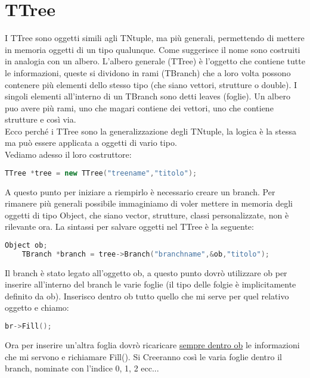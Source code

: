 \section{TTree}
I TTree sono oggetti simili agli TNtuple, ma più generali, permettendo di mettere in memoria oggetti di un tipo qualunque.
Come suggerisce il nome sono costruiti in analogia con un albero. L'albero generale (TTree) è l'oggetto che contiene tutte le informazioni, queste si dividono in rami (TBranch) che a loro volta possono contenere più elementi dello stesso tipo (che siano vettori, strutture o double). I singoli elementi all'interno di un TBranch sono detti leaves (foglie). Un albero puo avere più rami, uno che magari contiene dei vettori, uno che contiene strutture e così via.\\
Ecco perché i TTree sono la generalizzazione degli TNtuple, la logica è la stessa ma può essere applicata a oggetti di vario tipo.\\
Vediamo adesso il loro costruttore:
\begin{lstlisting}[language=C++,label={cod1},mathescape=true,breaklines=true]
	TTree *tree = new TTree("treename","titolo");
\end{lstlisting}
A questo punto per iniziare a riempirlo è necessario creare un branch. Per rimanere più generali possibile immaginiamo di voler mettere in memoria degli oggetti di tipo Object, che siano vector, strutture, classi personalizzate, non è rilevante ora. La sintassi per salvare oggetti nel TTree è la seguente:
\begin{lstlisting}[language=C++,label={cod1},mathescape=true,breaklines=true]
	Object ob;
	TBranch *branch = tree->Branch("branchname",&ob,"titolo");
\end{lstlisting}
Il branch è stato legato all'oggetto ob, a questo punto dovrò utilizzare ob per inserire all'interno del branch le varie foglie (il tipo delle folgie è implicitamente definito da ob). Inserisco dentro ob tutto quello che mi serve per quel relativo oggetto e chiamo:
\begin{lstlisting}[language=C++,label={cod1},mathescape=true,breaklines=true]
	br->Fill();
\end{lstlisting}
Ora per inserire un'altra foglia dovrò ricaricare \underline{sempre dentro ob} le informazioni che mi servono e richiamare Fill(). Si Creeranno così le varia foglie dentro il branch, nominate con l'indice 0, 1, 2 ecc...

